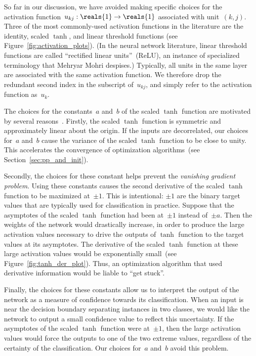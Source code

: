 \documentclass[11pt,a4paper]{article}
\numberwithin{equation}{section}
\begin{document}
So far in our discussion, we have avoided making specific choices for the
activation function~$u_{kj} : \reals{1} \to \reals{1}$ associated with unit~$(k,
j)$. Three of the most commonly-used activation functions in the literature are
the identity, scaled $\tanh$, and linear threshold functions (see
Figure~\ref{fig:activation_plots}). (In the neural network literature, linear
threshold functions are called ``rectified linear units''~(ReLU), an instance of
specialized terminology that Mehryar Mohri despises.) Typically, all units in
the same layer are associated with the same activation function. We therefore
drop the redundant second index in the subscript of~$u_{kj}$, and simply refer
to the activation function as~$u_k$.

The choices for the constants~$a$ and~$b$ of the scaled $\tanh$ function are
motivated by several reasons~\citep{lecun-98b}. Firstly, the scaled $\tanh$
function is symmetric and approximately linear about the origin. If the inputs
are decorrelated, our choices for~$a$ and~$b$ cause the variance of the scaled
$\tanh$ function to be close to unity. This accelerates the convergence of
optimization algorithms~(see Section~\ref{sec:pp_and_init}).

Secondly, the choices for these constant helps prevent the \emph{vanishing
gradient problem}. Using these constants causes the second derivative of the
scaled $\tanh$ function to be maximized at~$\pm 1$. This is intentional: $\pm 1$
are the binary target values that are typically used for classification in
practice. Suppose that the asymptotes of the scaled $\tanh$ function had been
at~$\pm 1$ instead of~$\pm a$. Then the weights of the network would drastically
increase, in order to produce the large activation values necessary to drive the
outputs of $\tanh$ function to the target values at its asymptotes.  The
derivative of the scaled $\tanh$ function at these large activation values would
be exponentially small~(see Figure~\ref{fig:tanh_der_plot}). Thus, an
optimization algorithm that used derivative information would be liable to ``get
stuck''.

Finally, the choices for these constants allow us to interpret the output of the
network as a measure of confidence towards its classification. When an input is
near the decision boundary separating instances in two classes, we would like
the network to output a small confidence value to reflect this uncertainty. If
the asymptotes of the scaled $\tanh$ function were at~$\pm 1$, then the large
activation values would force the outputs to one of the two extreme values,
regardless of the certainty of the classification. Our choices for~$a$ and~$b$
avoid this problem.
\end{document}
